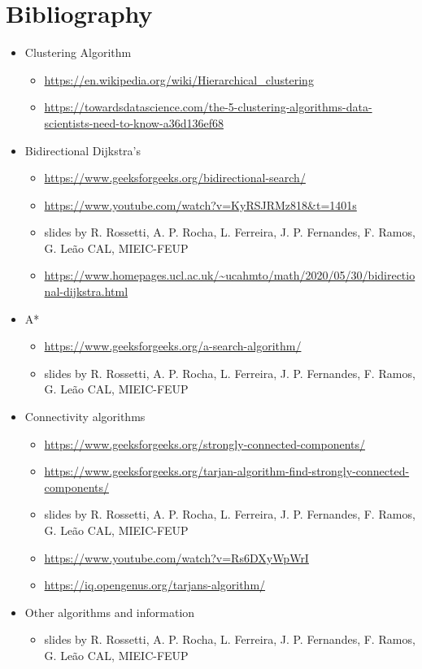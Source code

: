 \chapter{Bibliography}

\begin{itemize}
    \item Clustering Algorithm
    \begin{itemize}
        \item \url{https://en.wikipedia.org/wiki/Hierarchical_clustering}
        \item \url{https://towardsdatascience.com/the-5-clustering-algorithms-data-scientists-need-to-know-a36d136ef68}

    \end{itemize}
    \item Bidirectional Dijkstra's
    \begin{itemize}
        \item \url{https://www.geeksforgeeks.org/bidirectional-search/}
        \item \url{https://www.youtube.com/watch?v=KyRSJRMz818&t=1401s}
        \item slides by R. Rossetti, A. P. Rocha, L. Ferreira, J. P. Fernandes, F. Ramos, G. Leão
        CAL, MIEIC-FEUP
        \item \url{https://www.homepages.ucl.ac.uk/~ucahmto/math/2020/05/30/bidirectional-dijkstra.html}
    \end{itemize}
    \item A* 
    \begin{itemize}
        \item \url{https://www.geeksforgeeks.org/a-search-algorithm/}
        \item slides by R. Rossetti, A. P. Rocha, L. Ferreira, J. P. Fernandes, F. Ramos, G. Leão
        CAL, MIEIC-FEUP
    \end{itemize}
    \item Connectivity algorithms
    \begin{itemize}
        \item \url{https://www.geeksforgeeks.org/strongly-connected-components/}
        \item \url{https://www.geeksforgeeks.org/tarjan-algorithm-find-strongly-connected-components/}
        \item slides by R. Rossetti, A. P. Rocha, L. Ferreira, J. P. Fernandes, F. Ramos, G. Leão
        CAL, MIEIC-FEUP
        \item \url{https://www.youtube.com/watch?v=Rs6DXyWpWrI}
        \item \url{https://iq.opengenus.org/tarjans-algorithm/}
    \end{itemize}
    \item Other algorithms and information
    \begin{itemize}
        \item slides by R. Rossetti, A. P. Rocha, L. Ferreira, J. P. Fernandes, F. Ramos, G. Leão
        CAL, MIEIC-FEUP
    \end{itemize}
\end{itemize}
